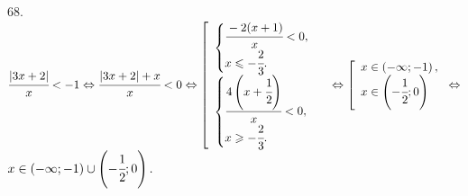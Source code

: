 68. $\cfrac{|3x+2|}{x}<-1\Leftrightarrow\cfrac{|3x+2|+x}{x}<0\Leftrightarrow
\left[\begin{array}{l}\begin{cases}\cfrac{-2(x+1)}{x}<0,\\ x\leqslant-\cfrac{2}{3}.\end{cases}\\ \begin{cases}\cfrac{4\left(x+\cfrac{1}{2}\right)}{x}<0,\\ x\geqslant-\cfrac{2}{3}.\end{cases}  \end{array}\right.\Leftrightarrow\left[\begin{array}{l} x\in\left(-\infty;-1\right),\\
x\in\left(-\cfrac{1}{2};0\right)\end{array}\right.\Leftrightarrow$\\$ x\in\left(-\infty;-1\right)\cup\left(-\cfrac{1}{2};0\right).$\\
